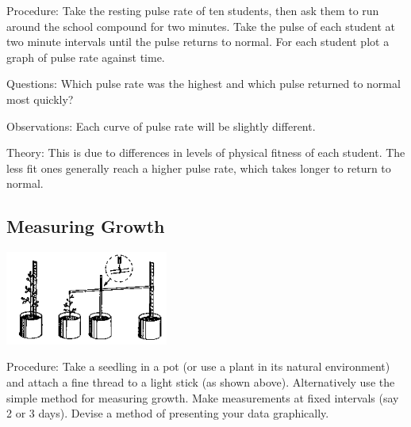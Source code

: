 \begin{multicols}{2}
\begin{description*}
\item[Procedure:]{Take the resting pulse rate of ten students, then ask them to run around the school
compound for two minutes. Take the pulse of each student at two minute intervals until the
pulse returns to normal. For each student plot a graph of pulse rate against time.}
\item[Questions:]{Which pulse rate was the highest and which pulse returned to normal most quickly?}
\item[Observations:]{Each curve of pulse rate will be slightly different.}
\item[Theory:]{This is due to differences in levels of physical fitness of each student. The less fit ones
generally reach a higher pulse rate, which takes longer to return to normal.}
\end{description*}

\subsection{Measuring Growth} 

\begin{center}
\includegraphics[width=0.4\textwidth]{./img/source/data-growth.png}
\end{center}

\begin{description*}
\item[Procedure:]{Take a seedling in a pot (or use a plant in its natural environment) and attach a fine thread
to a light stick (as shown above). Alternatively use the simple method for measuring growth.
Make measurements at fixed intervals (say 2 or 3 days). Devise a method of presenting your
data graphically.}
\end{description*}


\end{multicols}
